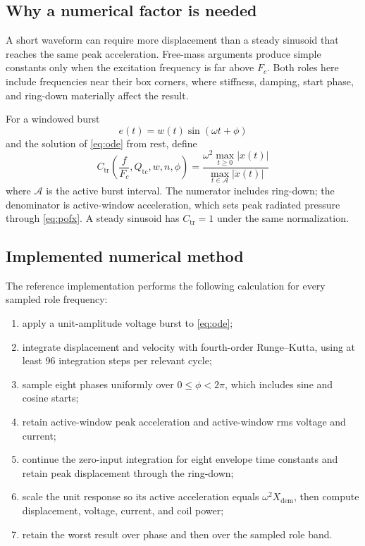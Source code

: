\documentclass[11pt,a4paper]{article}
\numberwithin{equation}{section}
\newcommand{\Qtc}{Q_{\mathrm{tc}}}
\begin{document}
\subsection{Why a numerical factor is needed}

A short waveform can require more displacement than a steady sinusoid that
reaches the same peak acceleration.  Free-mass arguments produce simple
constants only when the excitation frequency is far above $F_c$.  Both
roles here include frequencies near their box corners, where stiffness,
damping, start phase, and ring-down materially affect the result.

For a windowed burst
\begin{equation}
	e(t)=w(t)\sin(\omega t+\phi)
	\label{eq:burst}
\end{equation}
and the solution of \cref{eq:ode} from rest, define
\begin{equation}
	\boxed{
	C_{\mathrm{tr}}\left(
	\frac{f}{F_c},\Qtc,w,n,\phi
	\right)
	=
	\frac{\omega^2\max_{t\ge0}|x(t)|}
	{\max_{t\in\mathcal A}|\ddot x(t)|}}
	\label{eq:ctr}
\end{equation}
where $\mathcal A$ is the active burst interval.  The numerator includes
ring-down; the denominator is active-window acceleration, which sets peak
radiated pressure through \cref{eq:pofx}.  A steady sinusoid has
$C_{\mathrm{tr}}=1$ under the same normalization.

\subsection{Implemented numerical method}
\label{sec:time-method}

The reference implementation performs the following calculation for every
sampled role frequency:

\begin{enumerate}
	\item apply a unit-amplitude voltage burst to \cref{eq:ode};
	\item integrate displacement and velocity with fourth-order
	Runge--Kutta, using at least 96 integration steps per relevant cycle;
	\item sample eight phases uniformly over $0\le\phi<2\pi$, which includes
	sine and cosine starts;
	\item retain active-window peak acceleration and active-window rms
	voltage and current;
	\item continue the zero-input integration for eight envelope time
	constants and retain peak displacement through the ring-down;
	\item scale the unit response so its active acceleration equals
	$\omega^2X_{\mathrm{dem}}$, then compute displacement, voltage, current,
	and coil power;
	\item retain the worst result over phase and then over the sampled role
	band.
\end{enumerate}
\end{document}
